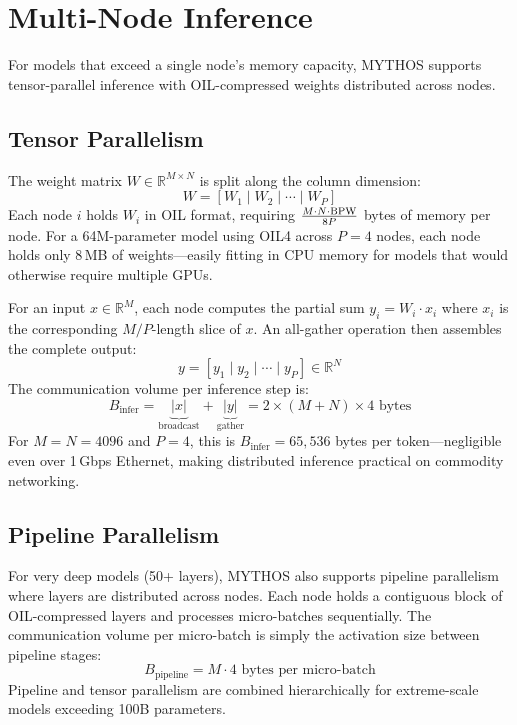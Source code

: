 \section{Multi-Node Inference}
\label{sec:multi_node_inference}

For models that exceed a single node's memory capacity, MYTHOS supports tensor-parallel inference with OIL-compressed weights distributed across nodes.

\subsection{Tensor Parallelism}

The weight matrix $W \in \mathbb{R}^{M \times N}$ is split along the column dimension:
\[
W = [W_1 \mid W_2 \mid \cdots \mid W_P]
\]
Each node $i$ holds $W_i$ in OIL format, requiring $\frac{M \cdot N \cdot \textnormal{BPW}}{8P}$ bytes of memory per node. For a 64M-parameter model using OIL4 across $P = 4$ nodes, each node holds only 8\,MB of weights---easily fitting in CPU memory for models that would otherwise require multiple GPUs.

For an input $x \in \mathbb{R}^M$, each node computes the partial sum $y_i = W_i \cdot x_i$ where $x_i$ is the corresponding $M/P$-length slice of $x$. An all-gather operation then assembles the complete output:
\[
y = [y_1 \mid y_2 \mid \cdots \mid y_P] \in \mathbb{R}^N
\]
The communication volume per inference step is:
\[
B_{\text{infer}} = \underbrace{|x|}_{\text{broadcast}} + \underbrace{|y|}_{\text{gather}} = 2 \times (M + N) \times 4 \text{ bytes}
\]
For $M = N = 4096$ and $P = 4$, this is $B_{\text{infer}} = 65{,}536$ bytes per token---negligible even over 1\,Gbps Ethernet, making distributed inference practical on commodity networking.

\subsection{Pipeline Parallelism}

For very deep models (50+ layers), MYTHOS also supports pipeline parallelism where layers are distributed across nodes. Each node holds a contiguous block of OIL-compressed layers and processes micro-batches sequentially. The communication volume per micro-batch is simply the activation size between pipeline stages:
\[
B_{\text{pipeline}} = M \cdot 4 \text{ bytes per micro-batch}
\]
Pipeline and tensor parallelism are combined hierarchically for extreme-scale models exceeding 100B parameters.

